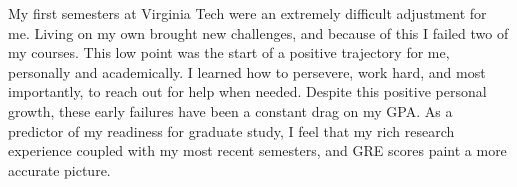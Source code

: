 \documentclass[12pt]{article}
\begin{document}
My first semesters at Virginia Tech were an extremely difficult adjustment for me.  Living on my own brought new challenges, and because of this I failed two of my courses.  This low point was the start of a positive trajectory for me, personally and academically.  I learned how to persevere, work hard, and most importantly, to reach out for help when needed.  Despite this positive personal growth, these early failures have been a constant drag on my GPA. As a predictor of my readiness for graduate study, I feel that my rich research experience coupled with my most recent semesters, and GRE scores paint a more accurate picture.
\end{document}
